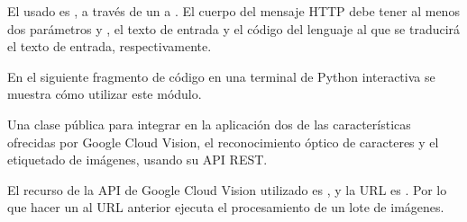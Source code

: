 El usado es , a través de un  a
. El cuerpo
del mensaje HTTP debe tener al menos dos parámetros  y ,
el texto de entrada y el código del lenguaje al que se traducirá el texto
de entrada, respectivamente.

En el siguiente fragmento de código en una terminal de Python interactiva
se muestra cómo utilizar este módulo.

\begin{sphinxVerbatim}[commandchars=\\\{\}]
   
  
 
\end{sphinxVerbatim}

\label{\detokenize{chapter_two/desc_cloudnao:module-app.tpa_client_libraries.google_cloud_vision}}\label{\detokenize{chapter_two/desc_cloudnao:module-google_cloud_vision}}



Una clase pública para integrar en la aplicación dos de las características
ofrecidas por Google Cloud Vision, el reconocimiento óptico de caracteres y
el etiquetado de imágenes, usando su API REST.

El recurso de la API de Google Cloud Vision utilizado es ,
y la URL es
. Por lo que hacer
un  al URL anterior ejecuta el procesamiento de un lote de imágenes.

